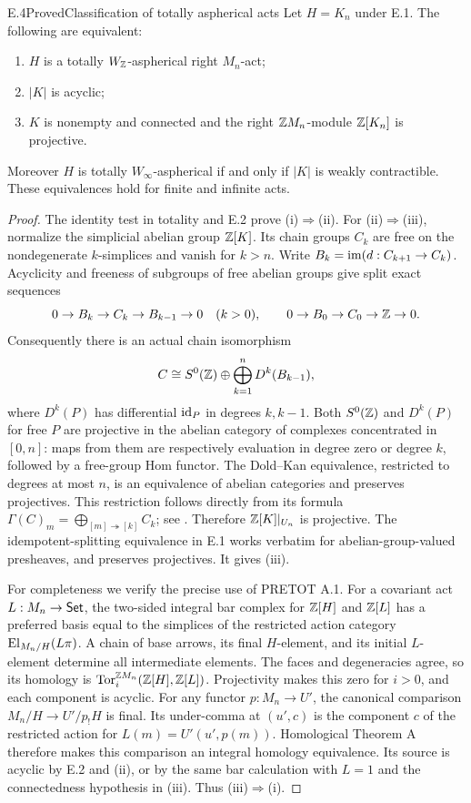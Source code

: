 \begin{claim}{E.4}{Proved}{Classification of totally aspherical acts}
\label{E:total}
Let $H=K_n$ under E.1. The following are equivalent:
\begin{enumerate}[label=(\roman*)]
\item $H$ is a totally $W_{\mathbb Z}$-aspherical right $M_n$-act;
\item $|K|$ is acyclic;
\item $K$ is nonempty and connected and the right $\mathbb Z M_n$-module
      $\mathbb Z[K_n]$ is projective.
\end{enumerate}
Moreover $H$ is totally $W_\infty$-aspherical if and only if $|K|$
is weakly contractible. These equivalences hold for finite and
infinite acts.
\end{claim}
\begin{proof}
The identity test in totality and E.2 prove (i)$\Rightarrow$(ii).
For (ii)$\Rightarrow$(iii), normalize the simplicial abelian group
$\mathbb Z[K]$. Its chain groups $C_k$ are free on the nondegenerate
$k$-simplices and vanish for $k>n$. Write $B_k=\operatorname{im}(d:C_{k+1}\to C_k)$.
Acyclicity and freeness of subgroups of free abelian groups give
split exact sequences
\[
 0\to B_k\to C_k\to B_{k-1}\to0\quad(k>0),\qquad
 0\to B_0\to C_0\to\mathbb Z\to0.
\]
Consequently there is an actual chain isomorphism
\[
 C\cong S^0(\mathbb Z)\oplus\bigoplus_{k=1}^n D^k(B_{k-1}),
\]
where $D^k(P)$ has differential $\mathrm{id}_P$ in degrees $k,k-1$.
Both $S^0(\mathbb Z)$ and $D^k(P)$ for free $P$ are projective in
the abelian category of complexes concentrated in $[0,n]$:
maps from them are respectively evaluation in degree zero or
degree $k$, followed by a free-group Hom functor. The Dold--Kan
equivalence, restricted to degrees at most $n$, is an equivalence
of abelian categories and preserves projectives. This restriction
follows directly from its formula
$\Gamma(C)_m=\bigoplus_{[m]\twoheadrightarrow[k]}C_k$;
see \citet[Theorem 14.24.3]{StacksDK}. Therefore
$\mathbb Z[K]|_{U_n}$ is projective. The idempotent-splitting equivalence
in E.1 works verbatim for abelian-group-valued presheaves, and
preserves projectives. It gives (iii).

For completeness we verify the precise use of PRETOT A.1.
For a covariant act $L:M_n\to\mathsf{Set}$, the two-sided integral bar
complex for $\mathbb Z[H]$ and $\mathbb Z[L]$ has a preferred basis equal to the
simplices of the restricted action category
$\operatorname{El}_{M_n/H}(L\pi)$. A chain of base arrows, its final $H$-element,
and its initial $L$-element determine all intermediate elements.
The faces and degeneracies agree, so its homology is
$\operatorname{Tor}_i^{\mathbb Z M_n}(\mathbb Z[H],\mathbb Z[L])$. Projectivity makes this zero for
$i>0$, and each component is acyclic. For any functor $p:M_n\to U'$,
the canonical comparison
$M_n/H\to U'/p_!H$ is final. Its under-comma at $(u',c)$ is the
component $c$ of the restricted action for
$L(m)=U'(u',p(m))$. Homological Theorem A therefore makes this
comparison an integral homology equivalence. Its source is acyclic
by E.2 and (ii), or by the same bar calculation with $L=1$ and the
connectedness hypothesis in (iii). Thus (iii)$\Rightarrow$(i).


\end{proof}
